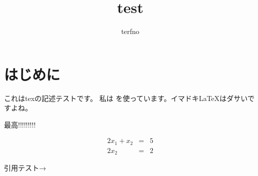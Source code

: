 \documentclass[a4paper]{article}
\begin{document}
  \title{test}
  \author{terfno}
  \maketitle

  \section{はじめに}
  これはtexの記述テストです。
  私は {\XeTeX} を使っています。イマドキ{\LaTeX}はダサいですよね。

  {\XeTeX}最高!!!!!!!!!

  \begin{eqnarray}
    2x_1 + x_2 & = & 5 \nonumber \\
    2x_2 & = & 2 \nonumber
  \end{eqnarray}

  引用テスト→\cite{lecun2015deep}

  
  
\end{document}
